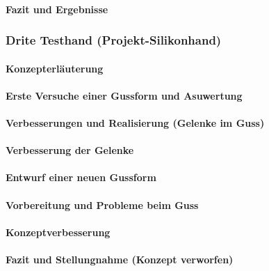 \documentclass[titlepage,12pt,twoside]{article}
\begin{document}
\paragraph{Fazit und Ergebnisse}
\hfill \break
\hfill \break

\subsubsection{Drite Testhand (Projekt-Silikonhand)}
\paragraph{Konzepterläuterung}
\hfill \break
\hfill \break

\paragraph{Erste Versuche einer Gussform und Asuwertung}
\hfill \break
\hfill \break

\paragraph{Verbesserungen und Realisierung (Gelenke im Guss)}
\hfill \break
\hfill \break

\paragraph{Verbesserung der Gelenke}
\hfill \break
\hfill \break

\paragraph{Entwurf einer neuen Gussform}
\hfill \break
\hfill \break

\paragraph{Vorbereitung und Probleme beim Guss}
\hfill \break
\hfill \break

\paragraph{Konzeptverbesserung}
\hfill \break
\hfill \break

\paragraph{Fazit und Stellungnahme (Konzept verworfen)}
\hfill \break
\hfill \break
\end{document}
